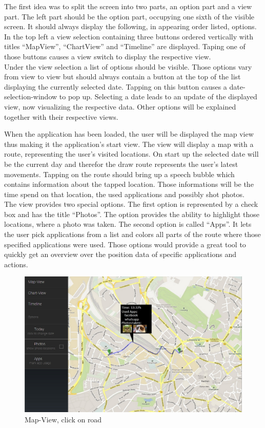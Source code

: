 The first idea was to split the screen into two parts, an option part and a view part. The left part should be the option part, occupying one sixth of the visible screen. It should always display the following, in appearing order listed, options.\\
In the top left a view selection containing three buttons  ordered vertically with titles ``MapView'', ``ChartView'' and ``Timeline'' are displayed. Taping one of those buttons causes a view switch to display the respective view.\\
Under the view selection a list of options should be visible. Those options vary from view to view but should always contain a button at the top of the list displaying the currently selected date. Tapping on this button causes a date-selection-window to pop up. Selecting a date leads to an update of the displayed view, now visualizing the respective data.
Other options will be explained together with their respective views.

When  the application has been loaded, the user will be displayed the map view thus making it the application's start view. The view will display a map with a route, representing the user's visited locations. On start up the selected date will be the current day and therefor the draw route represents the user's latest movements. Tapping on the route should bring up a speech bubble which contains information about the tapped location. Those informations will be the time spend on that location, the used applications and possibly shot photos.\\
The view provides two special options. The first option is represented by a check box and has the title ``Photos''. The option provides the ability to highlight those locations, where a photo was taken. The second option is called ``Apps''. It lets the user pick applications from a list and colors all parts of the route where those specified applications were used. Those options would provide a great tool to quickly get an overview over the position data of specific applications and actions. 

\begin{figure}[h]
	\caption{Map-View, click on road}
	\includegraphics[width=\textwidth]{images/Design/1b_onClickPageView.jpg}
\end{figure}

